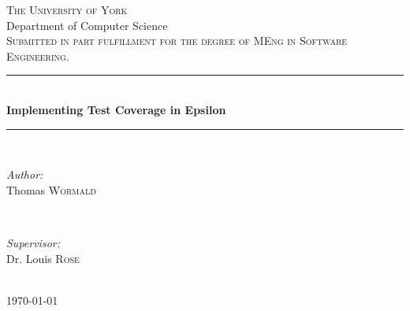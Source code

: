 \begin{titlepage}

\newcommand{\HRule}{\rule{\linewidth}{0.5mm}} %

\center %

\textsc{\LARGE The University of York}\\[1.5cm] %
\textsc{\Large }Department of Computer Science\\[0.5cm] %
\textsc{\large Submitted in part fulfillment for the degree of MEng in Software Engineering.}\\[0.5cm] %

\HRule \\[0.4cm]
{ \huge \bfseries Implementing Test Coverage in Epsilon}\\[0.4cm] %
\HRule \\[1.5cm]

\begin{minipage}{0.4\textwidth}
\begin{flushleft} \large
\emph{Author:}\\
Thomas \textsc{Wormald} %
\end{flushleft}
\end{minipage}
~
\begin{minipage}{0.4\textwidth}
\begin{flushright} \large
\emph{Supervisor:} \\
Dr. Louis \textsc{Rose} %
\end{flushright}
\end{minipage}\\[4cm]

{\large \today}\\[3cm] %


\vfill %

\end{titlepage}